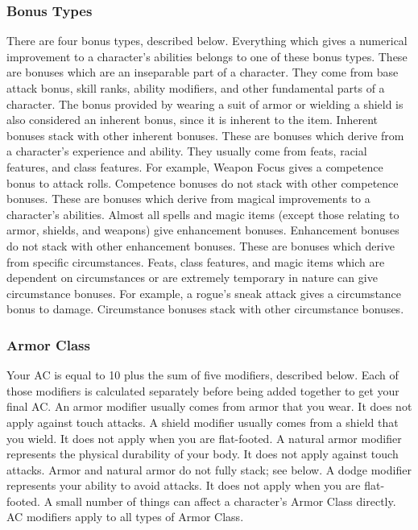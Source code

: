 \subsubsection{Bonus Types}
There are four bonus types, described below. Everything which gives a numerical improvement to a character's abilities belongs to one of these bonus types.
 These are bonuses which are an inseparable part of a character. They come from base attack bonus, skill ranks, ability modifiers, and other fundamental parts of a character. The bonus provided by wearing a suit of armor or wielding a shield is also considered an inherent bonus, since it is inherent to the item. Inherent bonuses stack with other inherent bonuses.
 These are bonuses which derive from a character's experience and ability. They usually come from feats, racial features, and class features. For example, Weapon Focus gives a competence bonus to attack rolls. Competence bonuses do not stack with other competence bonuses.
 These are bonuses which derive from magical improvements to a character's abilities. Almost all spells and magic items (except those relating to armor, shields, and weapons) give enhancement bonuses. Enhancement bonuses do not stack with other enhancement bonuses.
 These are bonuses which derive from specific circumstances. Feats, class features, and magic items which are dependent on circumstances or are extremely temporary in nature can give circumstance bonuses. For example, a rogue's sneak attack gives a circumstance bonus to damage. Circumstance bonuses stack with other circumstance bonuses.

\subsubsection{Armor Class}
Your AC is equal to 10 plus the sum of five modifiers, described below. Each of those modifiers is calculated separately before being added together to get your final AC. 
 An armor modifier usually comes from armor that you wear. It does not apply against touch attacks.
 A shield modifier usually comes from a shield that you wield. It does not apply when you are flat-footed.
 A natural armor modifier represents the physical durability of your body. It does not apply against touch attacks. Armor and natural armor do not fully stack; see below.
 A dodge modifier represents your ability to avoid attacks. It does not apply when you are flat-footed.
 A small number of things can affect a character's Armor Class directly. AC modifiers apply to all types of Armor Class.

